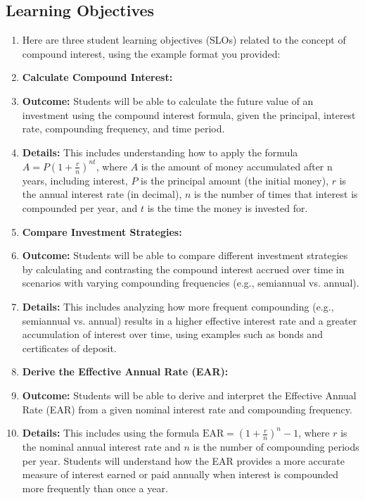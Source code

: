 \subsection{Learning Objectives}
\label{ssec:lear-fe6e}


\begin{enumerate}
    \item Here are three student learning objectives (SLOs) related to the concept of compound interest, using the example format you provided:
    \item \textbf{Calculate Compound Interest:}
    \item \textbf{Outcome:} Students will be able to calculate the future value of an investment using the compound interest formula, given the principal, interest rate, compounding frequency, and time period.
    \item \textbf{Details:} This includes understanding how to apply the formula $ A = P \left(1 + \frac{r}{n}\right)^{nt} $, where $ A $ is the amount of money accumulated after n years, including interest, $ P $ is the principal amount (the initial money), $ r $ is the annual interest rate (in decimal), $ n $ is the number of times that interest is compounded per year, and $ t $ is the time the money is invested for.
    \item \textbf{Compare Investment Strategies:}
    \item \textbf{Outcome:} Students will be able to compare different investment strategies by calculating and contrasting the compound interest accrued over time in scenarios with varying compounding frequencies (e.g., semiannual vs. annual).
    \item \textbf{Details:} This includes analyzing how more frequent compounding (e.g., semiannual vs. annual) results in a higher effective interest rate and a greater accumulation of interest over time, using examples such as bonds and certificates of deposit.
    \item \textbf{Derive the Effective Annual Rate (EAR):}
    \item \textbf{Outcome:} Students will be able to derive and interpret the Effective Annual Rate (EAR) from a given nominal interest rate and compounding frequency.
    \item \textbf{Details:} This includes using the formula $ \text{EAR} = \left(1 + \frac{r}{n}\right)^n - 1 $, where $ r $ is the nominal annual interest rate and $ n $ is the number of compounding periods per year. Students will understand how the EAR provides a more accurate measure of interest earned or paid annually when interest is compounded more frequently than once a year.
\end{enumerate}


